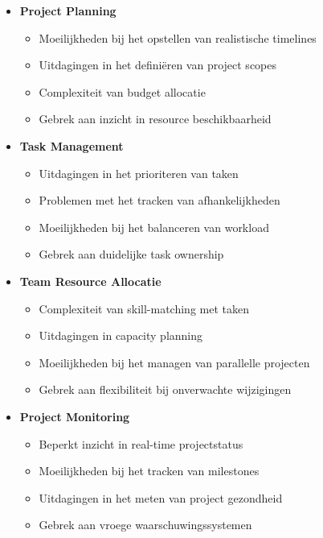 \begin{itemize}
    \item \textbf{Project Planning}
    \begin{itemize}
        \item Moeilijkheden bij het opstellen van realistische timelines
        \item Uitdagingen in het definiëren van project scopes
        \item Complexiteit van budget allocatie
        \item Gebrek aan inzicht in resource beschikbaarheid
    \end{itemize}
    
    \item \textbf{Task Management}
    \begin{itemize}
        \item Uitdagingen in het prioriteren van taken
        \item Problemen met het tracken van afhankelijkheden
        \item Moeilijkheden bij het balanceren van workload
        \item Gebrek aan duidelijke task ownership
    \end{itemize}
    
    \item \textbf{Team Resource Allocatie}
    \begin{itemize}
        \item Complexiteit van skill-matching met taken
        \item Uitdagingen in capacity planning
        \item Moeilijkheden bij het managen van parallelle projecten
        \item Gebrek aan flexibiliteit bij onverwachte wijzigingen
    \end{itemize}
    
    \item \textbf{Project Monitoring}
    \begin{itemize}
        \item Beperkt inzicht in real-time projectstatus
        \item Moeilijkheden bij het tracken van milestones
        \item Uitdagingen in het meten van project gezondheid
        \item Gebrek aan vroege waarschuwingssystemen
    \end{itemize}
\end{itemize}


